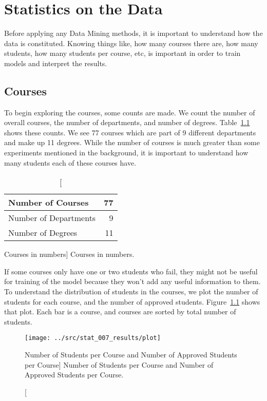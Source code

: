 \chapter{Statistics on the Data}
\label{sec:stats}

Before applying any Data Mining methods, it is important to understand how the
data is constituted. Knowing things like, how many courses there are, how many
students, how many students per course, etc, is important in order to train
models and interpret the results.

\section{Courses}

To begin exploring the courses, some counts are made. We count the number of
overall courses, the number of departments, and number of degrees.
Table~\ref{tab:courses_stats} shows these counts. We see 77 courses which are
part of 9 different departments and make up 11 degrees. While the number of
courses is much greater than some experiments mentioned in the background, it
is important to understand how many students each of these courses have.

\begin{table}[h!]
    \centering

    \begin{tabular}{| l | r |}
        \hline
        Number of Courses     & 77 \\ \hline
        Number of Departments & 9  \\ \hline
        Number of Degrees     & 11 \\ \hline
    \end{tabular}

    \caption
        [Courses in numbers]
        {Courses in numbers.}

    \label{tab:courses_stats}
\end{table}

If some courses only have one or two students who fail, they might not be
useful for training of the model because they won't add any useful information
to them. To understand the distribution of students in the courses, we plot the
number of students for each course, and the number of approved students.
Figure~\ref{fig:stat_007} shows that plot. Each bar is a course, and courses
are sorted by total number of students.

\begin{figure}[h!]
    \centering

    \texttt{[image: ../src/stat\_007\_results/plot]}

    \caption
        [Number of Students per Course and Number of Approved Students per
        Course]
        {Number of Students per Course and Number of Approved Students per
        Course.}

    \label{fig:stat_007}
\end{figure}

